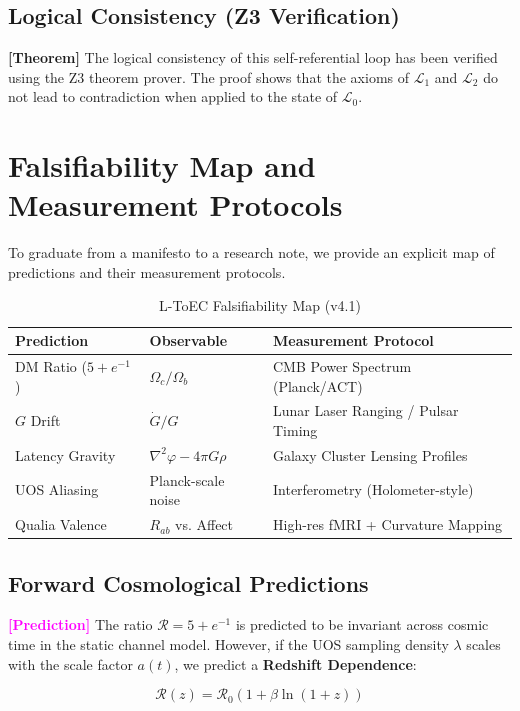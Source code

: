 \documentclass[11pt,titlepage]{article}
\newcommand{\substrate}{\mathcal{L}_0}
\newcommand{\protocol}{\mathcal{L}_1}
\newcommand{\logic}{\mathcal{L}_2}
\newcommand{\tagtheo}{\textcolor{green!60!black}{\textbf{[Theorem]}} }
\newcommand{\tagpred}{\textcolor{magenta}{\textbf{[Prediction]}} }
\begin{document}
\subsection{Logical Consistency (Z3 Verification)}
\tagtheo The logical consistency of this self-referential loop has been verified using the Z3 theorem prover. The proof shows that the axioms of $\protocol$ and $\logic$ do not lead to contradiction when applied to the state of $\substrate$.

\section{Falsifiability Map and Measurement Protocols}
\label{sec:falsifiability}
To graduate from a manifesto to a research note, we provide an explicit map of predictions and their measurement protocols.

\begin{table}[h!]
\centering
\begin{tabular}{@{}lll@{}}
\toprule
\textbf{Prediction} & \textbf{Observable} & \textbf{Measurement Protocol} \\ \midrule
DM Ratio ($5+e^{-1}$) & $\Omega_c / \Omega_b$ & CMB Power Spectrum (Planck/ACT) \\
$G$ Drift & $\dot{G}/G$ & Lunar Laser Ranging / Pulsar Timing \\
Latency Gravity & $\nabla^2 \varphi - 4\pi G \rho$ & Galaxy Cluster Lensing Profiles \\
UOS Aliasing & Planck-scale noise & Interferometry (Holometer-style) \\
Qualia Valence & $R_{ab}$ vs. Affect & High-res fMRI + Curvature Mapping \\ \bottomrule
\end{tabular}
\caption{L-ToEC Falsifiability Map (v4.1)}
\end{table}


\subsection{Forward Cosmological Predictions}
\tagpred The ratio $\mathcal{R} = 5 + e^{-1}$ is predicted to be invariant across cosmic time in the static channel model. However, if the UOS sampling density $\lambda$ scales with the scale factor $a(t)$, we predict a \textbf{Redshift Dependence}:

\begin{equation}
\mathcal{R}(z) = \mathcal{R}_0 (1 + \beta \ln(1+z))
\end{equation}
\end{document}
